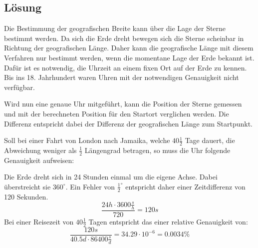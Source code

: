


\subsection{Lösung}
Die Bestimmung der geografischen Breite kann über die Lage der Sterne bestimmt 
werden. Da sich die Erde dreht bewegen sich die Sterne scheinbar in Richtung 
der geografischen Länge. Daher kann die geografische Länge mit diesem Verfahren 
nur bestimmt werden, wenn die momentane Lage der Erde bekannt ist. Dafür ist es 
notwendig, die Uhrzeit an einem fixen Ort auf der Erde zu kennen. Bis ins 18. 
Jahrhundert waren Uhren mit der notwendigen Genauigkeit nicht verfügbar. 

Wird nun eine genaue Uhr mitgeführt, kann die Position der Sterne gemessen und 
mit der berechneten Position für den Startort verglichen werden. Die Differenz 
entspricht dabei der Differenz der geografischen Länge zum Startpunkt. 

Soll bei einer Fahrt von London nach Jamaika, welche $40\frac{1}{2}$ Tage 
dauert, die Abweichung weniger als $\frac{1}{2}$ Längengrad betragen, so muss 
die Uhr folgende Genauigkeit aufweisen: 

Die Erde dreht sich in 24 Stunden einmal um die eigene Achse. Dabei 
überstreicht sie $360^\circ$. Ein Fehler von $\frac{1}{2}^\circ$ entspricht daher 
einer Zeitdifferenz von 120 Sekunden. 
\[ \frac{24h \cdot 3600\frac{s}{h}}{720} = 120 s \]
Bei einer Reisezeit von $40\frac{1}{2}$ Tagen entspricht das einer relative 
Genauigkeit von: 
\[ \frac{120 s}{40.5 d \cdot 86400 \frac{s}{d}} = 34.29 \cdot 10^{-6} 
= 0.0034\% \]